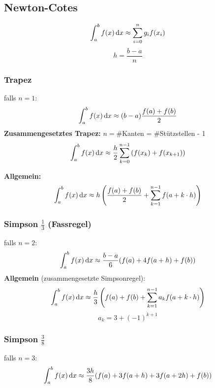 \documentclass[german]{latex4ei/latex4ei_sheet}
\begin{document}
\begin{sectionbox}
\subsection{Newton-Cotes}
\begin{equation*}
	\int_a^b f(x) \diff x \approx \sum_{i = 0}^n g_i f(x_i)
\end{equation*}
\begin{equation*}
	h = \frac{b - a}{n}
\end{equation*}

\subsubsection{Trapez}
falls $n = 1$:
\begin{equation*}
	\int_a^b f(x) \diff x \approx (b - a) \frac{f(a) + f(b)}{2}
\end{equation*}
\textbf{Zusammengesetztes Trapez: } $n = $\#Kanten = \#Stützstellen - 1
\begin{equation*}
	\int_a^b f(x) \diff x \approx  \frac{h}{2} \sum\limits_{k = 0}^{n-1} \left( f(x_k) + f(x_{k+1})  \right)
\end{equation*}

\textbf{Allgemein:}
\begin{equation*}
	\int_a^b f(x) \diff x \approx h \left( \frac{f(a) + f(b)}{2} + \sum_{k = 1}^{n - 1} f(a + k \cdot h) \right)
\end{equation*}
\end{sectionbox}

\begin{sectionbox}
\subsubsection{Simpson $\frac{1}{3}$ (Fassregel)}
falls $n = 2$:
\begin{equation*}
	\int_a^b f(x) \diff x \approx \frac{b - a}{6} (f(a) + 4 f(a + h) + f(b))
\end{equation*}
\textbf{Allgemein} (zusammengesetzte Simpsonregel):
\begin{equation*}
	\int_a^b f(x) \diff x \approx \frac{h}{3} \left( f(a) + f(b) + \sum_{k = 1}^{n - 1} a_k f(a + k \cdot h) \right)
\end{equation*}
\begin{equation*}
	a_k = 3 + (-1)^{k + 1}
\end{equation*}

\subsubsection{Simpson $\frac{3}{8}$}
falls $n = 3$:
\begin{equation*}
	\int_a^b f(x) \diff x \approx \frac{3h}{8} (f(a) + 3 f(a + h) + 3 f(a + 2h) + f(b))
\end{equation*}
\end{sectionbox}
\end{document}
